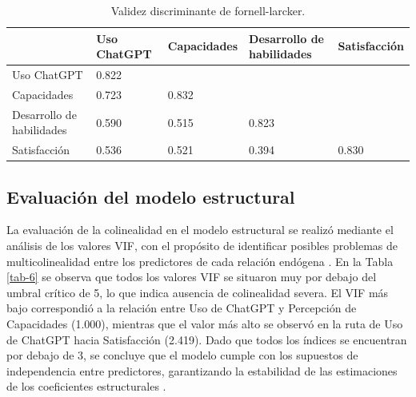 \documentclass[spanish]{textolivre}
\begin{document}
\begin{table}[h!]
\centering
\begin{threeparttable}
\small
\caption{Validez discriminante de fornell-larcker.}\label{tab-5}
\begin{tabular}{p{3.5cm} p{2cm} p{2cm} p{3.5cm} p{1.5cm}}
\toprule
 & Uso ChatGPT & Capacidades & Desarrollo de habilidades & Satisfacción \\
\midrule
Uso ChatGPT & 0.822 \\
Capacidades & 0.723 & 0.832 \\
Desarrollo de habilidades & 0.590 & 0.515 & 0.823 \\
Satisfacción & 0.536 & 0.521 & 0.394 & 0.830 \\
\bottomrule
\end{tabular}
\end{threeparttable}
\end{table}

\subsection{Evaluación del modelo estructural}
La evaluación de la colinealidad en el modelo estructural se realizó mediante el análisis de los valores VIF, con el propósito de identificar posibles problemas de multicolinealidad entre los predictores de cada relación endógena \cite{hair2021}. En la Tabla \ref{tab-6} se observa que todos los valores VIF se situaron muy por debajo del umbral crítico de 5, lo que indica ausencia de colinealidad severa. El VIF más bajo correspondió a la relación entre Uso de ChatGPT y Percepción de Capacidades (1.000), mientras que el valor más alto se observó en la ruta de Uso de ChatGPT hacia Satisfacción (2.419). Dado que todos los índices se encuentran por debajo de 3, se concluye que el modelo cumple con los supuestos de independencia entre predictores, garantizando la estabilidad de las estimaciones de los coeficientes estructurales \cite{aburumman2023}.
\end{document}
